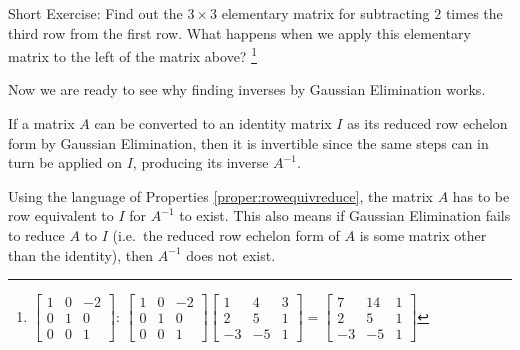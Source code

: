 Short Exercise: Find out the $3 \times 3$ elementary matrix for subtracting $2$ times the third row from the first row. What happens when we apply this elementary matrix to the left of the matrix above? \footnote{$
\begin{bmatrix}
1 & 0 & -2 \\
0 & 1 & 0 \\
0 & 0 & 1
\end{bmatrix}$:  
$\begin{bmatrix}
1 & 0 & -2 \\
0 & 1 & 0 \\
0 & 0 & 1
\end{bmatrix}
\begin{bmatrix}
1 & 4 & 3 \\
2 & 5 & 1 \\
-3 & -5 & 1
\end{bmatrix}
=
\begin{bmatrix}
7 & 14 & 1 \\
2 & 5 & 1 \\
-3 & -5 & 1
\end{bmatrix}
$}\par
Now we are ready to see why finding inverses by Gaussian Elimination works.
\begin{thm}
\label{thm:Gausselimprincip}
If a matrix $A$ can be converted to an identity matrix $I$ as its reduced row echelon form by Gaussian Elimination, then it is invertible since the same steps can in turn be applied on $I$, producing its inverse $A^{-1}$. 
\end{thm}
Using the language of Properties \ref{proper:rowequivreduce}, the matrix $A$ has to be row equivalent to $I$ for $A^{-1}$ to exist. This also means if Gaussian Elimination fails to reduce $A$ to $I$ (i.e.\ the reduced row echelon form of $A$ is some matrix other than the identity), then $A^{-1}$ does not exist.
